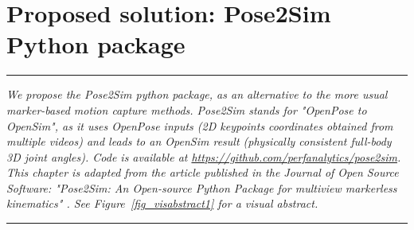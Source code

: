 
\lhead[\fancyplain{}{\leftmark}]%
      {\fancyplain{}{}} %
\chead[\fancyplain{}{}]%
      {\fancyplain{}{}}
\rhead[\fancyplain{}{}]%
      {\fancyplain{}{\rightmark}}%
\lfoot[\fancyplain{}{}]%
      {\fancyplain{}{}}
\cfoot[\fancyplain{}{\thepage}]%
      {\fancyplain{}{\thepage}} %
\rfoot[\fancyplain{}{}]%
     {\fancyplain{}{\scriptsize}}



\chapter{Proposed solution: Pose2Sim Python package}
\label{ch:3}


\begin{center}
\rule{0.7\linewidth}{.5pt}
\begin{minipage}{0.7\linewidth}
\smallskip

\textit{We propose the Pose2Sim python package, as an alternative to the more usual marker-based motion capture methods. Pose2Sim stands for "OpenPose to OpenSim", as it uses OpenPose inputs (2D keypoints coordinates obtained from multiple videos) and leads to an OpenSim result (physically consistent full-body 3D joint angles). Code is available at \url{https://github.com/perfanalytics/pose2sim}. \newline \newline
This chapter is adapted from the article published in the Journal of Open Source Software: "Pose2Sim: An Open-source Python Package for multiview markerless kinematics" \cite{Pagnon2022b}. See Figure~\ref{fig_visabstract1} for a visual abstract.}

\end{minipage}
\smallskip
\rule{0.7\linewidth}{.5pt}
\end{center}

